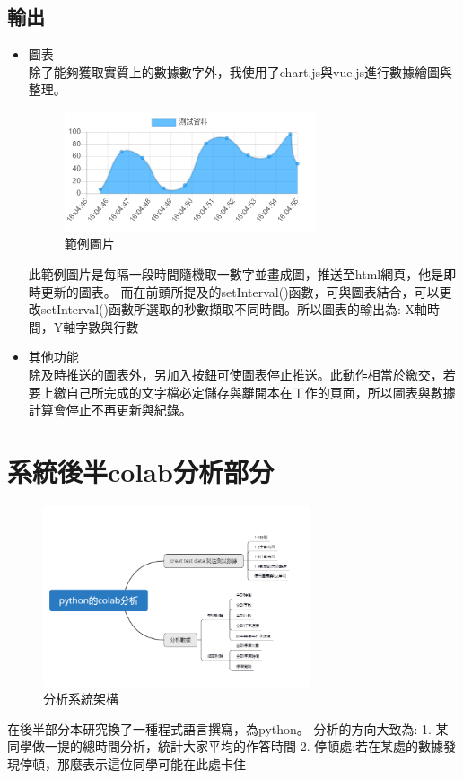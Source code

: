 \subsection{輸出}
\begin{itemize}
	\item 圖表\\
	除了能夠獲取實質上的數據數字外，我使用了chart.js與vue.js進行數據繪圖與整理。\cite{name21}
	\begin{figure}[H] %
		\centering %
		\includegraphics[width=0.7\textwidth]{3_1_3.png} %
		\caption{範例圖片} %
		\label{Fig.3.2} %
	\end{figure}
此範例圖片是每隔一段時間隨機取一數字並畫成圖，推送至html網頁，他是即時更新的圖表。
而在前頭所提及的setInterval()函數，可與圖表結合，可以更改setInterval()函數所選取的秒數擷取不同時間。所以圖表的輸出為: X軸時間，Y軸字數與行數
	\item 其他功能\\
	除及時推送的圖表外，另加入按鈕可使圖表停止推送。此動作相當於繳交，若要上繳自己所完成的文字檔必定儲存與離開本在工作的頁面，所以圖表與數據計算會停止不再更新與紀錄。
\end{itemize}
\section{系統後半colab分析部分}
	\begin{figure}[H] %
	\centering %
	\includegraphics[width=0.7\textwidth]{3_2.png} %
	\caption{分析系統架構} %
	\label{Fig.3.3} %
	\end{figure}
在後半部分本研究換了一種程式語言撰寫，為python。
分析的方向大致為:
1. 某同學做一提的總時間分析，統計大家平均的作答時間
2. 停頓處:若在某處的數據發現停頓，那麼表示這位同學可能在此處卡住

